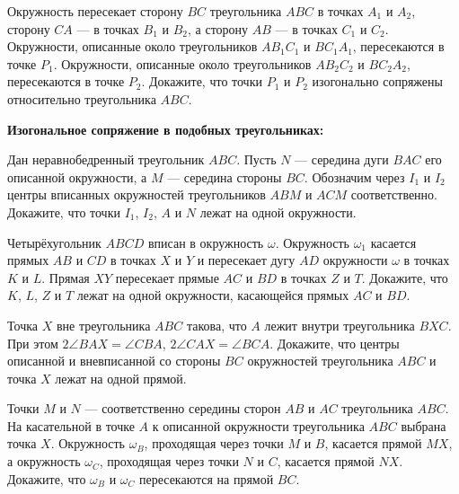 \documentclass{article}
\begin{document}
\begin{enumerate_boxed}
        \item  Окружность пересекает сторону \(BC\) треугольника \(ABC\) в точках \(A_1\) и \(A_2\), сторону \(CA\) — в точках \(B_1\) и \(B_2\), а сторону \(AB\) — в точках \(C_1\) и \(C_2\).
        Окружности, описанные около треугольников \(AB_{1}C_1\) и \(BC_{1}A_1\), пересекаются в точке \(P_1\).
        Окружности, описанные около треугольников \(AB_{2}C_2\) и \(BC_{2}A_2\), пересекаются в точке \(P_2\).
        Докажите, что точки \(P_1\) и \(P_2\) изогонально сопряжены относительно треугольника \(ABC\).

        \textbf{Изогональное сопряжение в подобных треугольниках:}

        \item Дан неравнобедренный треугольник \(ABC\).
        Пусть \(N\) — середина дуги \(BAC\) его описанной окружности, а \(M\) — середина стороны \(BC\).
        Обозначим через \(I_1\) и \(I_2\) центры вписанных окружностей треугольников \(ABM\) и \(ACM\) соответственно.
        Докажите, что точки \(I_1\), \(I_2\), \(A\) и \(N\) лежат на одной окружности.

        \item Четырёхугольник \(ABCD\) вписан в окружность \(\omega\).
        Окружность \(\omega_1\) касается прямых \(AB\) и \(CD\) в точках \(X\) и \(Y\) и пересекает дугу \(AD\) окружности \(\omega\) в точках \(K\) и \(L\).
        Прямая \(XY\) пересекает прямые \(AC\) и \(BD\) в точках \(Z\) и \(T\).
        Докажите, что \(K\), \(L\), \(Z\) и \(T\) лежат на одной окружности, касающейся прямых \(AC\) и \(BD\).

        \item Точка \(X\) вне треугольника \(ABC\) такова, что \(A\) лежит внутри треугольника \(BXC\).
        При этом \(2\angle BAX = \angle CBA\), \(2\angle CAX = \angle BCA\).
        Докажите, что центры описанной и вневписанной со стороны \(BC\) окружностей треугольника \(ABC\) и точка \(X\) лежат на одной прямой.

        \item Точки \(M\) и \(N\) — соответственно середины сторон \(AB\) и \(AC\) треугольника \(ABC\).
        На касательной в точке \(A\) к описанной окружности треугольника \(ABC\) выбрана точка \(X\).
        Окружность \(\omega_B\), проходящая через точки \(M\) и \(B\), касается прямой \(MX\), а окружность \(\omega_C\), проходящая через точки \(N\) и \(C\), касается прямой \(NX\).
        Докажите, что \(\omega_B\) и \(\omega_C\) пересекаются на прямой \(BC\).


\end{enumerate_boxed}
\end{document}
